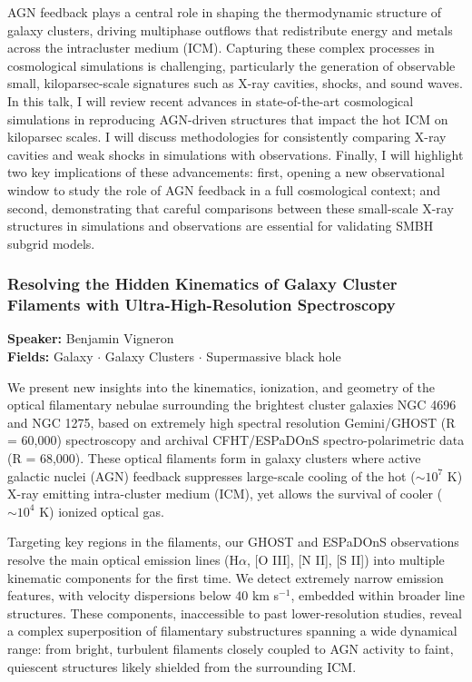 AGN feedback plays a central role in shaping the thermodynamic structure of galaxy clusters, driving multiphase outflows that redistribute energy and metals across the intracluster medium (ICM). Capturing these complex processes in cosmological simulations is challenging, particularly the generation of observable small, kiloparsec-scale signatures such as X-ray cavities, shocks, and sound waves. In this talk, I will review recent advances in state-of-the-art cosmological simulations in reproducing AGN-driven structures that impact the hot ICM on kiloparsec scales. I will discuss methodologies for consistently comparing X-ray cavities and weak shocks in simulations with observations. Finally, I will highlight two key implications of these advancements: first, opening a new observational window to study the role of AGN feedback in a full cosmological context; and second, demonstrating that careful comparisons between these small-scale X-ray structures in simulations and observations are essential for validating SMBH subgrid models.

\hypertarget{abstract-talk-5}{}\label{abstract-page-talk-5}
\subsubsection*{Resolving the Hidden Kinematics of Galaxy Cluster Filaments with Ultra-High-Resolution Spectroscopy}
\textbf{Speaker:} Benjamin Vigneron\\
\textbf{Fields:} Galaxy $\cdot$ Galaxy Clusters $\cdot$ Supermassive black hole

We present new insights into the kinematics, ionization, and geometry of the optical filamentary nebulae surrounding the brightest cluster galaxies NGC 4696 and NGC 1275, based on extremely high spectral resolution Gemini/GHOST (R = 60,000) spectroscopy and archival CFHT/ESPaDOnS spectro-polarimetric data (R = 68,000). These optical filaments form in galaxy clusters where active galactic nuclei (AGN) feedback suppresses large-scale cooling of the hot ($\sim10^7$ K) X-ray emitting intra-cluster medium (ICM), yet allows the survival of cooler ($\sim10^4$ K) ionized optical gas.

Targeting key regions in the filaments, our GHOST and ESPaDOnS observations resolve the main optical emission lines (H$\alpha$, [O III], [N II], [S II]) into multiple kinematic components for the first time. We detect extremely narrow emission features, with velocity dispersions below 40 km s$^{-1}$, embedded within broader line structures. These components, inaccessible to past lower-resolution studies, reveal a complex superposition of filamentary substructures spanning a wide dynamical range: from bright, turbulent filaments closely coupled to AGN activity to faint, quiescent structures likely shielded from the surrounding ICM.

